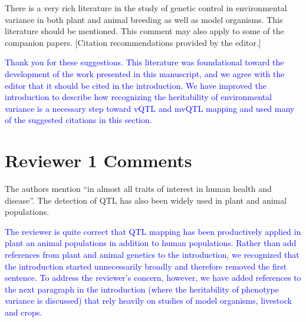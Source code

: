 \documentclass[11pt]{article}
\newcommand{\ReviewerQuestion}[1]{
  \vspace{5pt}\goodbreak
  \noindent\fbox{Reviewer:} #1
  \normalfont\par
}
\newcommand{\EditorQuestion}[1]{
  \vspace{5pt}\goodbreak
  \noindent\fbox{Editor:} #1
  \normalfont\par
}
\newcommand{\Response}[1]{
  \goodbreak
  \textcolor{blue}{#1}
  \normalfont\par
}
\begin{document}
\EditorQuestion{
  There is a very rich literature in the study of genetic control in environmental variance in both plant and animal breeding as well as model organisms.
  This literature should be mentioned. This comment may also apply to some of the companion papers.
  [Citation recommendations provided by the editor.]
}
\Response{
  Thank you for these suggestions. 
  This literature was foundational toward the development of the work presented in this manuscript, and we agree with the editor that it should be cited in the introduction.
  We have improved the introduction to describe how recognizing the heritability of environmental variance is a necessary step toward vQTL and mvQTL mapping and used many of the suggested citations in this section.
}







\section*{Reviewer 1 Comments}

\ReviewerQuestion{
  The authors mention ``in almost all traits of interest in human health and disease''.
  The detection of QTL has also been widely used in plant and animal populations.
}
\Response{
  The reviewer is quite correct that QTL mapping has been productively applied in plant an animal populations in addition to human populations.
  Rather than add references from plant and animal genetics to the introduction, we recognized that the introduction started unnecessarily broadly and therefore removed the first sentence.
  To address the reviewer's concern, however, we have added references to the next paragraph in the introduction (where the heritability of phenotype variance is discussed) that rely heavily on studies of model organisms, livestock and crops.
}
\end{document}

